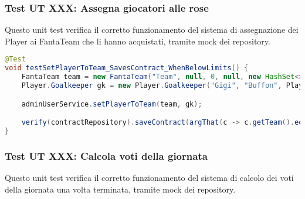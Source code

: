 \subsubsection{Test UT XXX: Assegna giocatori alle rose} \label{UT5}

Questo unit test verifica il corretto funzionamento del sistema di assegnazione dei Player ai FantaTeam che li hanno acquistati,
tramite mock dei repository.

\begin{lstlisting}[language=Java]
@Test
void testSetPlayerToTeam_SavesContract_WhenBelowLimits() {
	FantaTeam team = new FantaTeam("Team", null, 0, null, new HashSet<>());
	Player.Goalkeeper gk = new Player.Goalkeeper("Gigi", "Buffon", Player.Club.JUVENTUS);

	adminUserService.setPlayerToTeam(team, gk);

	verify(contractRepository).saveContract(argThat(c -> c.getTeam().equals(team) && c.getPlayer().equals(gk)));
}
\end{lstlisting}


\subsubsection{Test UT XXX: Calcola voti della giornata} \label{UT6}

Questo unit test verifica il corretto funzionamento del sistema di calcolo dei voti della giornata una volta terminata,
tramite mock dei repository.

